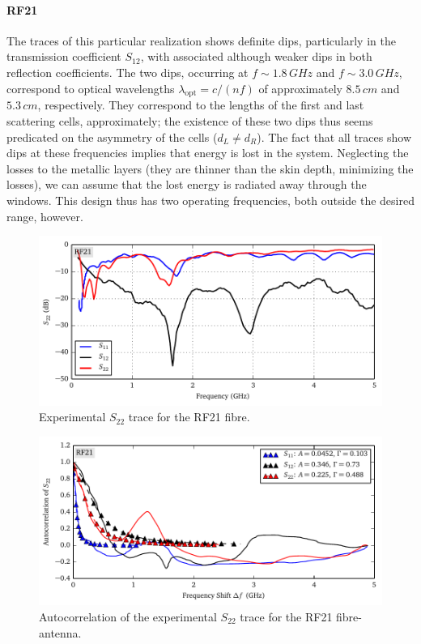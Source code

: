 \paragraph{RF21}
The traces of this particular realization shows definite dips, particularly
in the transmission coefficient $S_{12}$, with associated although weaker
dips in both reflection coefficients. The two dips, occurring at $f\sim1.8\,\unit{GHz}$
and $f\sim3.0\,\unit{GHz}$, correspond to optical wavelengths $\lambda_\text{opt}=c/(nf)$ 
of approximately $8.5\,\unit{cm}$ and $5.3\,\unit{cm}$, respectively. They correspond
to the lengths of the first and last scattering cells, approximately; the existence
of these two dips thus seems predicated on the asymmetry of the cells ($d_L\neq d_R$). The fact that all
traces show dips at these frequencies implies that energy is lost in the system. Neglecting
the losses to the metallic layers (they are thinner than the skin depth, minimizing the losses),
we can assume that the lost energy is radiated away through the windows. This design thus 
has two operating frequencies, both outside the desired range, however. 

\begin{figure}[h]
 \centering
 \includegraphics{figs/active/RF21-sParameters.pdf}
 \caption[Experimental $S_{22}$ trace for the RF21 fibre]
 		{Experimental $S_{22}$ trace for the RF21 fibre.}
 \label{fig:active.lcx.rf21sParameters}
\end{figure}

\begin{figure}[h]
 \centering
 \includegraphics{figs/active/RF21-autoCorrelation.pdf}
 \caption[Autocorrelation of the experimental $S_{22}$ trace for the RF21 fibre-antenna]
 		{Autocorrelation of the experimental $S_{22}$ trace for the RF21 fibre-antenna.}
 \label{fig:active.lcx.rf21autocorrelation}
\end{figure}

